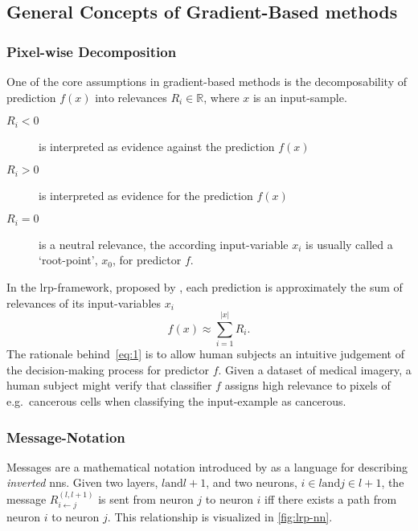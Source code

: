 \subsection{General Concepts of Gradient-Based methods}
\subsubsection{Pixel-wise Decomposition}\label{subsubsect:pixel-wise-decomp}
One of the core assumptions in gradient-based methods is the decomposability of prediction \(f(x)\) into relevances \(R_i \in \mathbb R\), where \(x\) is an input-sample. 
\begin{description}
    \item[\(R_i < 0\)] is interpreted as evidence against the prediction \(f(x)\)
    \item[\(R_i > 0\)] is interpreted as evidence for the prediction \(f(x)\)
    \item[\(R_i = 0\)] is a neutral relevance, the according input-variable \(x_i\) is usually called a `root-point'\cite{Bach.2015}, \(x_0\), for predictor \(f\).
\end{description}
In the \gls{lrp}-framework, proposed by , each prediction is approximately the sum of relevances of its input-variables \(x_i\)
\begin{equation}
    f(x) \approx \sum_{i=1}^{|x|} R_i.\label{eq:1}
\end{equation}
The rationale behind~\cref{eq:1} is to allow human subjects an intuitive judgement of the decision-making process for predictor \(f\). Given a dataset of medical imagery, a human subject might verify that classifier \(f\) assigns high relevance to pixels of e.g.\ cancerous cells when classifying the input-example as cancerous.

\subsubsection{Message-Notation}\label{subsubsect:message-notation}
Messages are a mathematical notation introduced by  as a language for describing \textit{inverted} \glspl{nn}. Given two layers, \(l \text{and} l+1\), and two neurons, \(i\in l \text{and} j\in l+1\), the message \(R_{i\leftarrow j}^{(l, l+1)}\) is sent from neuron \(j\) to neuron \(i\) iff there exists a \gls{path} from neuron \(i\) to neuron \(j\). This relationship is visualized in \cref{fig:lrp-nn}.